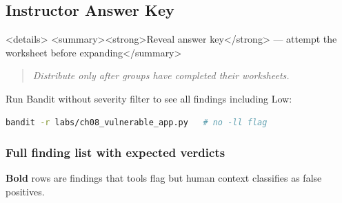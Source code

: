 \documentclass[11pt,a4paper]{book}
\begin{document}
\medskip

\subsection{Instructor Answer Key}

<details>
<summary><strong>Reveal answer key</strong> --- attempt the worksheet before expanding</summary>

\begin{quote}
\textit{\textit{Distribute only after groups have completed their worksheets.}}
\end{quote}

Run Bandit without severity filter to see all findings including Low:

\begin{lstlisting}[language=Bash]
bandit -r labs/ch08_vulnerable_app.py   # no -ll flag
\end{lstlisting}

\subsubsection{Full finding list with expected verdicts}

\textbf{Bold} rows are findings that tools flag but human context classifies as false positives.
\end{document}
